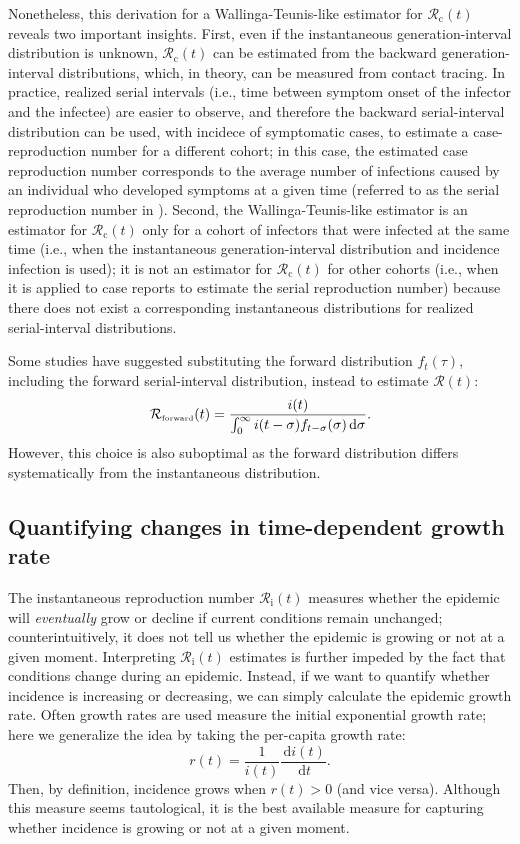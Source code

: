 \documentclass[12pt]{article}
\newcommand{\Rx}[1]{\ensuremath{{\mathcal R}_{#1}}\xspace}
\newcommand{\Rc}{\Rx{\mathrm{c}}}
\newcommand{\Ri}{\Rx{\mathrm{i}}}
\newcommand{\RR}{\ensuremath{{\mathcal R}}\xspace}
\newcommand{\tsub}[2]{#1_{{\textrm{\tiny #2}}}}
\newcommand{\dd}[1]{\ensuremath{\, \mathrm{d}#1}}
\newcommand{\dsigma}{\dd{\sigma}}
\begin{document}
Nonetheless, this derivation for a Wallinga-Teunis-like estimator for $\Rc(t)$ reveals two important insights.
First, even if the instantaneous generation-interval distribution is unknown, $\Rc(t)$ can be estimated from the backward generation-interval distributions, which, in theory, can be measured from contact tracing.
In practice, realized serial intervals (i.e., time between symptom onset of the infector and the infectee) are easier to observe, and therefore the backward serial-interval distribution can be used, with incidece of symptomatic cases, to estimate a case-reproduction number for a different cohort; in this case, the estimated case reproduction number corresponds to the average number of infections caused by an individual who developed symptoms at a given time (referred to as the serial reproduction number in \cite{park2020forward}).
Second, the Wallinga-Teunis-like estimator is an estimator for $\Rc(t)$ only for a cohort of infectors that were infected at the same time (i.e., when the instantaneous generation-interval distribution and incidence infection is used);
it is not an estimator for $\Rc(t)$ for other cohorts (i.e., when it is applied to case reports to estimate the serial reproduction number) because there does not exist a corresponding instantaneous distributions for realized serial-interval distributions.

Some studies have suggested substituting the forward distribution $f_t(\tau)$, including the forward serial-interval distribution, instead to estimate $\RR(t)$:
\begin{equation}
\tsub{\RR}{forward}(t) = \frac{i(t)}{\int_0^\infty i(t-\sigma) f_{t-\sigma}(\sigma) \dsigma}.
\end{equation}
However, this choice is also suboptimal as the forward distribution differs systematically from the instantaneous distribution.

\subsection{Quantifying changes in time-dependent growth rate}

The instantaneous reproduction number $\Ri(t)$ measures whether the epidemic will \emph{eventually} grow or decline if current conditions remain unchanged;
counterintuitively, it does not tell us whether the epidemic is growing or not at a given moment.
Interpreting $\Ri(t)$ estimates is further impeded by the fact that conditions change during an epidemic.
Instead, if we want to quantify whether incidence is increasing or decreasing, we can simply calculate the epidemic growth rate.
Often growth rates are used measure the initial exponential growth rate; here we generalize the idea by taking the per-capita growth rate:
\begin{equation}
r(t) = \frac{1}{i(t)} \frac{\dd{i(t)}}{\dd{t}}.
\end{equation}
Then, by definition, incidence grows when $r(t) > 0$ (and vice versa).
Although this measure seems tautological, it is the best available measure for capturing whether incidence is growing or not at a given moment.
\end{document}
